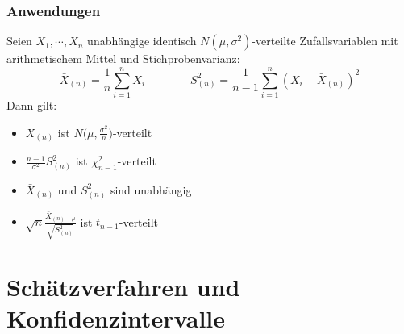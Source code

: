 		\subsection{Anwendungen}
			Seien \( X_1, \cdots, X_n \) unabhängige identisch \( N(\mu, \sigma^2) \)-verteilte Zufallsvariablen mit arithmetischem Mittel und Stichprobenvarianz:
			\begin{equation*}
				\bar{X}_{(n)} = \frac{1}{n} \sum_{i = 1}^{n} X_i \qquad\qquad S_{(n)}^2 = \frac{1}{n - 1} \sum_{i = 1}^{n} (X_i - \bar{X}_{(n)})^2
			\end{equation*}
			Dann gilt:
			\begin{itemize}
				\item \( \bar{X}_{(n)} \) ist \( N\Big(\mu, \frac{\sigma^2}{n}\Big) \)-verteilt
				\item \( \frac{n - 1}{\sigma^2} S_{(n)}^2 \) ist \( \chi_{n - 1}^2 \)-verteilt
				\item \( \bar{X}_{(n)} \) und \( S_{(n)}^2 \) sind unabhängig
				\item \( \sqrt{n} \frac{\bar{X}_{(n) - \mu}}{\sqrt{S_{(n)}^2}} \) ist \( t_{n-1} \)-verteilt
			\end{itemize}

\chapter{Schätzverfahren und Konfidenzintervalle}

